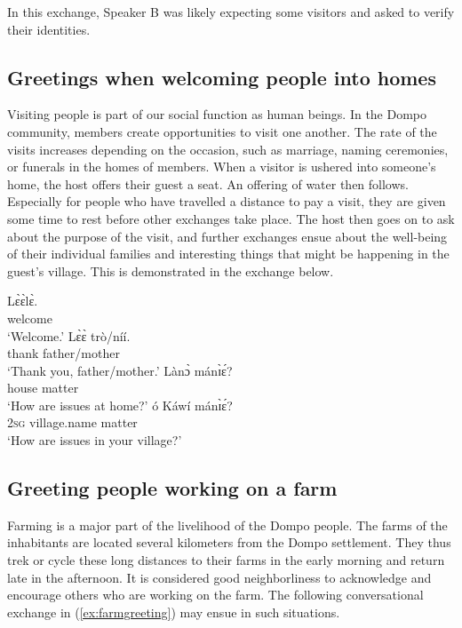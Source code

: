 \documentclass[output=paper,colorlinks,citecolor=brown]{langscibook}
\begin{document}
In this exchange, Speaker B was likely expecting some visitors and asked to verify their identities. 

\subsection{Greetings when welcoming people into homes}

Visiting people is part of our social function as human beings. In the Dompo community, members create opportunities to visit one another. The rate of the visits increases depending on the occasion, such as marriage, naming ceremonies, or funerals in the homes of members. When a visitor is ushered into someone's home, the host offers their guest a seat. An offering of water then follows. Especially for people who have travelled a distance to pay a visit, they are given some time to rest before other exchanges take place. The host then goes on to ask about the purpose of the visit, and further exchanges ensue about the well-being of their individual families and interesting things that might be happening in the guest’s village. This is demonstrated in the exchange below.

\ea \label{ex:welcomehome}
\begin{xlist}
\ex 
    \gll Lɛ̀ɛ̀lɛ̀.\\
			welcome\\
	\glt	‘Welcome.’
\ex
   \gll  Lɛ̀ɛ̀	trò/níí.\\
			thank	father/mother\\
		\glt ‘Thank you, father/mother.’
\ex
   \gll Lànɔ̀	mánɪ̀ɛ́?\footnotemark[4]\\
    house	matter	\\
\glt			‘How are issues at home?’
 \ex
   \gll ó	  Káwí		mánɪ̀ɛ́?\\
   \textsc{2sg}	village.name		matter	\\
\glt			‘How are issues in your village?’
\end{xlist}
\z

\subsection{Greeting people working on a farm}

Farming is a major part of the livelihood of the Dompo people. The farms of the inhabitants are located several kilometers from the Dompo settlement. They thus trek or cycle these long distances to their farms in the early morning and return late in the afternoon. It is considered good neighborliness to acknowledge and encourage others who are working on the farm. The following conversational exchange in (\ref{ex:farmgreeting}) may ensue in such situations.
\end{document}
